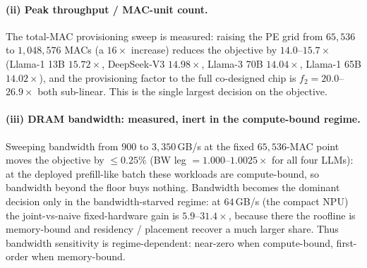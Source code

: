 \begin{table}[ht!]
\centering
\caption{Global-buffer sweep, DeepSeek-V3 on TPU-v3 ($900$\,GB/s, native cache
convention, HiGHS-Optimal).
The joint (free-$y$) LP is essentially
$C_{\mathrm{GM}}$-insensitive ($0.39\%$ over a $64\times$ sweep); the fixed-tile
FAST-subset LP is not ($1.18\times$).
Objective in LP cycles.}
\label{tab:deficit_cgm}
\small
{}
\end{table}

\paragraph{(ii) Peak throughput / MAC-unit count.} The total-MAC provisioning sweep is measured: raising the PE
grid from $65{,}536$ to $1{,}048{,}576$ MACs (a $16\times$ increase) reduces the objective by $14.0$--$15.7\times$ (Llama-1 13B $15.72\times$, DeepSeek-V3 $14.98\times$, Llama-3 70B $14.04\times$, Llama-1 65B $14.02\times$), and the provisioning factor to the full co-designed chip is $f_2=20.0$--$26.9\times$ both sub-linear.
This is the single largest decision on the objective.

\paragraph{(iii) DRAM bandwidth: measured, inert in the compute-bound regime.}
Sweeping bandwidth from $900$ to $3{,}350$\,GB/s at the fixed $65{,}536$-MAC point moves the objective by $\le0.25\%$ (BW leg $=1.000$--$1.0025\times$ for all four LLMs): at the deployed prefill-like batch these workloads are compute-bound, so bandwidth beyond the floor buys nothing.
Bandwidth becomes the dominant decision only in the bandwidth-starved regime: at $64$\,GB/s (the compact NPU) the joint-vs-naive fixed-hardware gain is $5.9$--$31.4\times$, because there the roofline is memory-bound and residency / placement recover a much larger share.
Thus bandwidth sensitivity is regime-dependent: near-zero when compute-bound, first-order when memory-bound.


